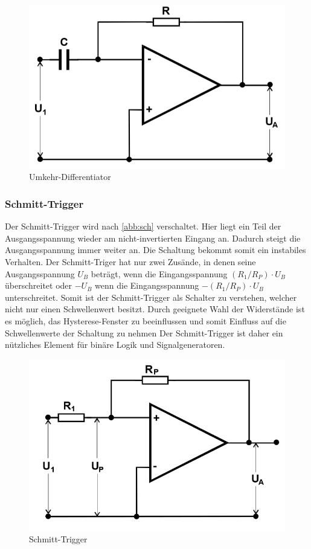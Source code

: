 \begin{figure}[h!]
 	\centering
 	\includegraphics[width=\textwidth]{img/diff.png}
 	\caption{Umkehr-Differentiator \cite{FP}}
 	\label{abb:diff}
\end{figure}


\subsubsection{Schmitt-Trigger}
Der Schmitt-Trigger wird nach \autoref{abb:sch} verschaltet. Hier liegt ein Teil der Ausgangsspannung wieder am  nicht-invertierten Eingang an. Dadurch steigt die Ausgangsspannung immer weiter an. Die Schaltung bekommt somit ein instabiles Verhalten. Der Schmitt-Triger hat nur zwei Zusände, in denen seine Ausgangsspannung $U_B$ beträgt, wenn die Eingangsspannung $(R_1 / R_P) \cdot U_B$ überschreitet oder
$-U_B$ wenn die Eingangsspannung $-(R_1 / R_P) \cdot U_B$ unterschreitet. Somit ist der Schmitt-Trigger als Schalter zu verstehen, welcher nicht nur einen Schwellenwert besitzt.  Durch geeignete Wahl der Widerstände ist es möglich, das Hysterese-Fenster zu beeinflussen und somit Einfluss auf die Schwellenwerte der Schaltung zu nehmen Der Schmitt-Trigger ist daher ein nützliches Element für binäre Logik und Signalgeneratoren.

\begin{figure}[h!]
 	\centering
 	\includegraphics[width=\textwidth]{img/schmitt.png}
 	\caption{Schmitt-Trigger \cite{FP}}
 	\label{abb:sch}
\end{figure}

